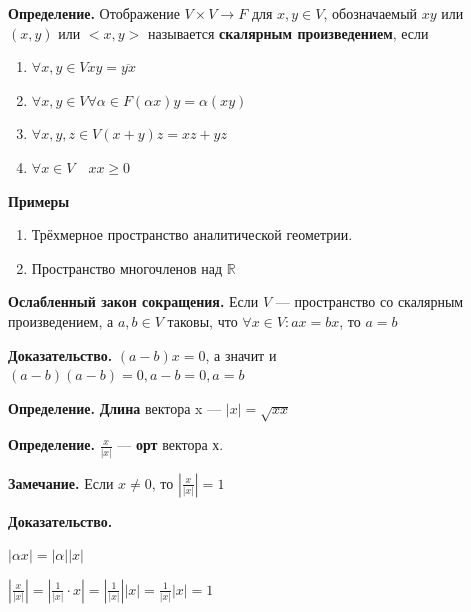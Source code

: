 \documentclass[a4paper]{article}
\begin{document}
    \newpage \begin{center}
                 \begin{Large}
                 \end{Large}
    \end{center}

    \textbf{Определение.} Отображение $V \times V \rightarrow F$ для $x, y \in V$, обозначаемый $xy$ или $(x,y)$ или $<x,y>$ называется \textbf{скалярным произведением}, если
    \begin{enumerate}
        \item $\forall x, y \in V xy =  \overline{yx}$
        \item $\forall x,y \in V \forall \alpha \in F (\alpha x) y = \alpha (xy)$
        \item $\forall x, y, z \in V (x+y)z = xz + yz$
        \item $\forall x \in V \quad xx \geq 0$
    \end{enumerate}
    \textbf{Примеры}

    \begin{enumerate}
        \item Трёхмерное пространство аналитической геометрии.
        \item Пространство многочленов над $\mathbb{R}$
    \end{enumerate}

    \begin{htheorem}
        \textbf{Ослабленный закон сокращения.} Если $V$ --- пространство со скалярным произведением, а $a,b \in V$ таковы, что $\forall x \in V: ax = bx$, то $a=b$
    \end{htheorem}

    \begin{hproof}
        \textbf{Доказательство.} $(a-b)x = 0$, а значит и $(a-b)(a-b) = 0, a-b = 0, a=b$
    \end{hproof}

    \textbf{Определение.} \textbf{Длина} вектора x --- $|x| = \sqrt{xx}$

    \textbf{Определение.} $\displaystyle \frac{x}{|x|}$ --- \textbf{орт} вектора х.
    \begin{htheorem}
        \textbf{Замечание.} Если $x \neq 0$, то $\displaystyle \left| \frac{x}{|x|} \right| = 1$
    \end{htheorem}

    \begin{hproof}
        \textbf{Доказательство.}

        $|\alpha x| = |\alpha||x|$

        $\displaystyle  \left| \frac{x}{|x|} \right| =  \left| \frac{1}{|x|} \cdot x \right| =  \left| \frac{1}{|x|} \right| |x| =   \frac{1}{|x|} |x| = 1$
    \end{hproof}
\end{document}
